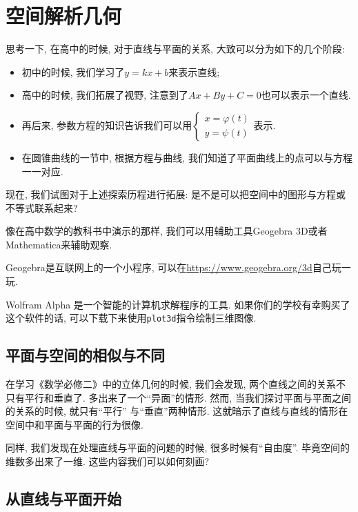 \section{空间解析几何}

思考一下, 在高中的时候, 对于直线与平面的关系, 大致可以分为如下的几个阶段: 
\begin{itemize}
	\item 初中的时候, 我们学习了$y=kx+b$来表示直线;
	\item 高中的时候, 我们拓展了视野, 注意到了$Ax+By+C=0$也可以表示一个直线. 
	\item 再后来, 参数方程的知识告诉我们可以用$\begin{cases}
		x=\varphi(t)\\
		y=\psi(t)
	\end{cases}$表示. 
	\item 在圆锥曲线的一节中, 根据方程与曲线, 我们知道了平面曲线上的点可以与方程一一对应. 
\end{itemize}

现在, 我们试图对于上述探索历程进行拓展: 是不是可以把空间中的图形与方程或不等式联系起来? 

\begin{tool}
	像在高中数学的教科书中演示的那样, 我们可以用辅助工具Geogebra 3D或者Mathematica来辅助观察. 
	
	Geogebra是互联网上的一个小程序, 可以在\url{https://www.geogebra.org/3d}自己玩一玩. 
	
	Wolfram Alpha 是一个智能的计算机求解程序的工具. 如果你们的学校有幸购买了这个软件的话, 可以下载下来使用\texttt{plot3d}指令绘制三维图像. 
\end{tool}

\subsection{平面与空间的相似与不同}

在学习《数学必修二》中的立体几何的时候, 我们会发现, 两个直线之间的关系不只有平行和垂直了. 多出来了一个``异面''的情形. 然而, 当我们探讨平面与平面之间的关系的时候, 就只有``平行'' 与``垂直''两种情形. 这就暗示了直线与直线的情形在空间中和平面与平面的行为很像. 

同样, 我们发现在处理直线与平面的问题的时候, 很多时候有``自由度''. 毕竟空间的维数多出来了一维. 这些内容我们可以如何刻画? 

\subsection{从直线与平面开始}

